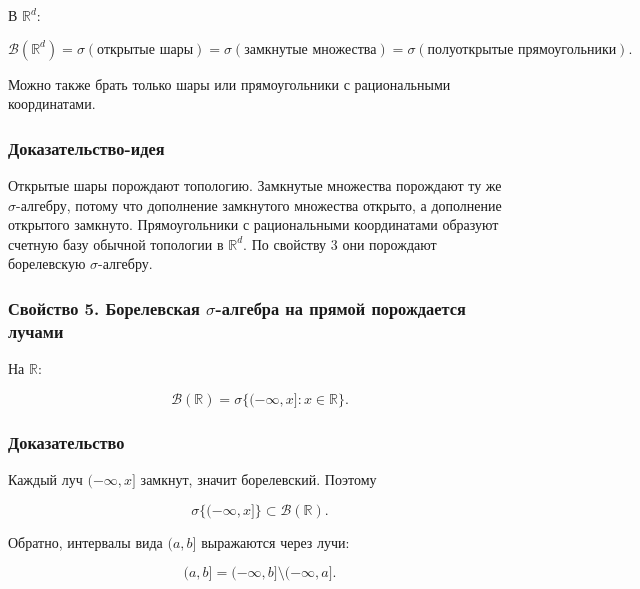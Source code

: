\documentclass[
  11pt,
  a4paper,
]{article}
\begin{document}
В \(\mathbb R^d\):

\[
\mathcal B(\mathbb R^d)
=
\sigma(\text{открытые шары})
=
\sigma(\text{замкнутые множества})
=
\sigma(\text{полуоткрытые прямоугольники}).
\]

Можно также брать только шары или прямоугольники с рациональными
координатами.

\subsubsection{Доказательство-идея}\label{ux434ux43eux43aux430ux437ux430ux442ux435ux43bux44cux441ux442ux432ux43e-ux438ux434ux435ux44f}

Открытые шары порождают топологию. Замкнутые множества порождают ту же
\(\sigma\)-алгебру, потому что дополнение замкнутого множества открыто,
а дополнение открытого замкнуто. Прямоугольники с рациональными
координатами образуют счетную базу обычной топологии в \(\mathbb R^d\).
По свойству 3 они порождают борелевскую \(\sigma\)-алгебру.

\subsubsection{\texorpdfstring{Свойство 5. Борелевская
\(\sigma\)-алгебра на прямой порождается
лучами}{Свойство 5. Борелевская \textbackslash sigma-алгебра на прямой порождается лучами}}\label{ux441ux432ux43eux439ux441ux442ux432ux43e-5.-ux431ux43eux440ux435ux43bux435ux432ux441ux43aux430ux44f-sigma-ux430ux43bux433ux435ux431ux440ux430-ux43dux430-ux43fux440ux44fux43cux43eux439-ux43fux43eux440ux43eux436ux434ux430ux435ux442ux441ux44f-ux43bux443ux447ux430ux43cux438}

На \(\mathbb R\):

\[
\mathcal B(\mathbb R)=\sigma\{(-\infty,x]:x\in\mathbb R\}.
\]

\subsubsection{Доказательство}\label{ux434ux43eux43aux430ux437ux430ux442ux435ux43bux44cux441ux442ux432ux43e-3}

Каждый луч \((-\infty,x]\) замкнут, значит борелевский. Поэтому

\[
\sigma\{(-\infty,x]\}\subset\mathcal B(\mathbb R).
\]

Обратно, интервалы вида \((a,b]\) выражаются через лучи:

\[
(a,b]=(-\infty,b]\setminus(-\infty,a].
\]
\end{document}
